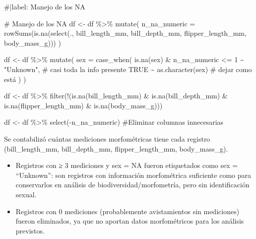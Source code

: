 \documentclass[
  spanish,
  11pt,
  a4paper,
  DIV=11,
  numbers=noendperiod]{scrartcl}
\newenvironment{Shaded}{\begin{snugshade}}{\end{snugshade}}
\newcommand{\AttributeTok}[1]{\textcolor[rgb]{0.40,0.45,0.13}{#1}}
\newcommand{\CommentTok}[1]{\textcolor[rgb]{0.37,0.37,0.37}{#1}}
\newcommand{\ConstantTok}[1]{\textcolor[rgb]{0.56,0.35,0.01}{#1}}
\newcommand{\DecValTok}[1]{\textcolor[rgb]{0.68,0.00,0.00}{#1}}
\newcommand{\FunctionTok}[1]{\textcolor[rgb]{0.28,0.35,0.67}{#1}}
\newcommand{\NormalTok}[1]{\textcolor[rgb]{0.00,0.23,0.31}{#1}}
\newcommand{\OtherTok}[1]{\textcolor[rgb]{0.00,0.23,0.31}{#1}}
\newcommand{\SpecialCharTok}[1]{\textcolor[rgb]{0.37,0.37,0.37}{#1}}
\newcommand{\StringTok}[1]{\textcolor[rgb]{0.13,0.47,0.30}{#1}}
\begin{document}
\begin{Shaded}
\begin{Highlighting}[numbers=left,,]
\CommentTok{\#|label: Manejo de los NA}

\CommentTok{\# Manejo de los NA}
\NormalTok{df }\OtherTok{\textless{}{-}}\NormalTok{ df }\SpecialCharTok{\%\textgreater{}\%}
  \FunctionTok{mutate}\NormalTok{(}
    \AttributeTok{n\_na\_numeric =} \FunctionTok{rowSums}\NormalTok{(}\FunctionTok{is.na}\NormalTok{(}\FunctionTok{select}\NormalTok{(., bill\_length\_mm, bill\_depth\_mm,}
\NormalTok{                                        flipper\_length\_mm, body\_mass\_g)))}
\NormalTok{  )}

\NormalTok{df }\OtherTok{\textless{}{-}}\NormalTok{ df }\SpecialCharTok{\%\textgreater{}\%}
  \FunctionTok{mutate}\NormalTok{(}
    \AttributeTok{sex =} \FunctionTok{case\_when}\NormalTok{(}
      \FunctionTok{is.na}\NormalTok{(sex) }\SpecialCharTok{\&}\NormalTok{ n\_na\_numeric }\SpecialCharTok{\textless{}=} \DecValTok{1} \SpecialCharTok{\textasciitilde{}} \StringTok{"Unknown"}\NormalTok{,  }\CommentTok{\# casi toda la info presente}
      \ConstantTok{TRUE} \SpecialCharTok{\textasciitilde{}} \FunctionTok{as.character}\NormalTok{(sex)                    }\CommentTok{\# dejar como está}
\NormalTok{    )}
\NormalTok{  )}

\NormalTok{df }\OtherTok{\textless{}{-}}\NormalTok{ df }\SpecialCharTok{\%\textgreater{}\%}
  \FunctionTok{filter}\NormalTok{(}\SpecialCharTok{!}\NormalTok{(}\FunctionTok{is.na}\NormalTok{(bill\_length\_mm) }\SpecialCharTok{\&}
           \FunctionTok{is.na}\NormalTok{(bill\_depth\_mm) }\SpecialCharTok{\&}
           \FunctionTok{is.na}\NormalTok{(flipper\_length\_mm) }\SpecialCharTok{\&}
           \FunctionTok{is.na}\NormalTok{(body\_mass\_g)))}


\NormalTok{df }\OtherTok{\textless{}{-}}\NormalTok{ df }\SpecialCharTok{\%\textgreater{}\%} \FunctionTok{select}\NormalTok{(}\SpecialCharTok{{-}}\NormalTok{n\_na\_numeric) }\CommentTok{\#Eliminar columnas innecesarias}
\end{Highlighting}
\end{Shaded}

Se contabilizó cuántas mediciones morfométricas tiene cada registro
(bill\_length\_mm, bill\_depth\_mm, flipper\_length\_mm, body\_mass\_g).

\begin{itemize}
\item
  Registros con ≥ 3 mediciones y sex = NA fueron etiquetados como sex =
  ``Unknown'': son registros con información morfométrica suficiente
  como para conservarlos en análisis de biodiversidad/morfometría, pero
  sin identificación sexual.
\item
  Registros con 0 mediciones (probablemente avistamientos sin
  mediciones) fueron eliminados, ya que no aportan datos morfométricos
  para los análisis previstos.
\end{itemize}
\end{document}
